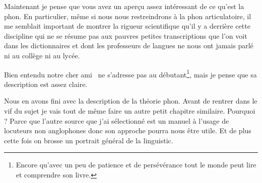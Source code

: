 Maintenant je pense que vous avez un aperçu assez intéressant de ce
qu'est la \gls{phon}. En particulier, même si nous nous restreindrons
à la \gls{phon} articulatoire, il me semblait important de montrer la
rigueur scientifique qu'il y a derrière cette discipline qui ne se
résume pas aux pauvres petites transcriptions que l'on voit dans les
dictionnaires et dont les professeurs de langues ne nous ont jamais
parlé ni au collège ni au lycée.

Bien entendu notre cher ami~\cite{lodge} ne s'adresse pas au
débutant\footnote{Encore qu'avec un peu de patience et de persévérance
tout le monde peut lire et comprendre son livre.}, mais je pense que sa
description est assez claire.

Nous en avons fini avec la description de la théorie \gls{phon}. Avant
de rentrer dans le vif du sujet je vais tout de même faire un autre
petit chapitre similaire. Pourquoi ? Parce que l'autre source que j'ai
sélectionné est un manuel à l'usage de locuteurs non anglophones donc
son approche pourra nous être utile. Et de plus cette fois on brosse
un portrait général de la \gls{linguistic}.

\newpage
\minitoc
\newpage

